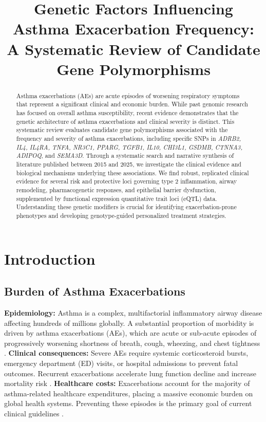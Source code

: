 \documentclass[11pt,a4paper]{article}
\title{Genetic Factors Influencing Asthma Exacerbation Frequency: A Systematic Review of Candidate Gene Polymorphisms}
\author{}
\date{}
\begin{document}
\maketitle

\begin{abstract}
Asthma exacerbations (AEs) are acute episodes of worsening respiratory symptoms that represent a significant clinical and economic burden. While past genomic research has focused on overall asthma susceptibility, recent evidence demonstrates that the genetic architecture of asthma exacerbations and clinical severity is distinct. This systematic review evaluates candidate gene polymorphisms associated with the frequency and severity of asthma exacerbations, including specific SNPs in \textit{ADRB2, IL4, IL4RA, TNFA, NR3C1, PPARG, TGFB1, IL10, CHI3L1, GSDMB, CTNNA3, ADIPOQ}, and \textit{SEMA3D}. Through a systematic search and narrative synthesis of literature published between 2015 and 2025, we investigate the clinical evidence and biological mechanisms underlying these associations. We find robust, replicated clinical evidence for several risk and protective loci governing type 2 inflammation, airway remodeling, pharmacogenetic responses, and epithelial barrier dysfunction, supplemented by functional expression quantitative trait loci (eQTL) data. Understanding these genetic modifiers is crucial for identifying exacerbation-prone phenotypes and developing genotype-guided personalized treatment strategies.
\end{abstract}

\section{Introduction}

\subsection{Burden of Asthma Exacerbations}
\textbf{Epidemiology:} Asthma is a complex, multifactorial inflammatory airway disease affecting hundreds of millions globally. A substantial proportion of morbidity is driven by asthma exacerbations (AEs), which are acute or sub-acute episodes of progressively worsening shortness of breath, cough, wheezing, and chest tightness \cite{ChenZheng2025, OjangurenQuirce2025}.
\textbf{Clinical consequences:} Severe AEs require systemic corticosteroid bursts, emergency department (ED) visits, or hospital admissions to prevent fatal outcomes. Recurrent exacerbations accelerate lung function decline and increase mortality risk \cite{PuranikForno2017}.
\textbf{Healthcare costs:} Exacerbations account for the majority of asthma-related healthcare expenditures, placing a massive economic burden on global health systems. Preventing these episodes is the primary goal of current clinical guidelines \cite{WangTantisira2016}.
\end{document}
